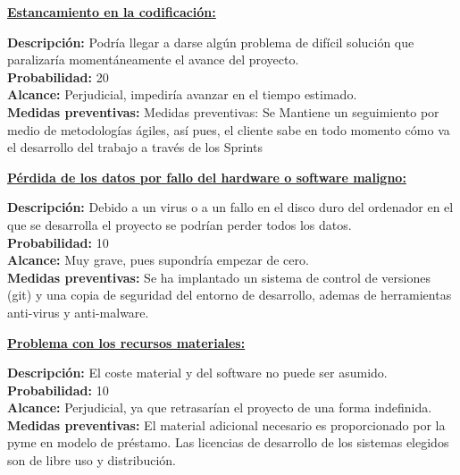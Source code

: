	\begin{shaded}
		\underline{\textbf{Estancamiento en la codificación:}}
		\begin{flushleft}	
			\textbf{Descripción:}  Podría llegar a darse algún problema de difícil solución que paralizaría momentáneamente el avance del proyecto.\\
			\textbf{Probabilidad:} 20\\
			\textbf{Alcance:} Perjudicial, impediría avanzar en el tiempo estimado.\\
			\textbf{Medidas preventivas:} Medidas preventivas: Se Mantiene un seguimiento por medio de metodologías ágiles, así pues, el cliente sabe en todo momento cómo va el desarrollo del trabajo a través de los Sprints  
		\end{flushleft}			
	\end{shaded}
\clearpage	
	\begin{shaded}
		\underline{\textbf{Pérdida de los datos por fallo del hardware o software maligno:}}
		\begin{flushleft}	
			\textbf{Descripción:} Debido a un virus o a un fallo en el disco duro del ordenador en el que se desarrolla el proyecto se podrían perder todos los datos.\\
			\textbf{Probabilidad:} 10\\
			\textbf{Alcance:} Muy grave, pues supondría empezar de cero.\\
			\textbf{Medidas preventivas:} Se ha implantado un sistema de control de versiones (git) y una copia de seguridad del entorno de desarrollo, ademas de herramientas anti-virus y anti-malware. 
		\end{flushleft}			
	\end{shaded}
		
	\begin{shaded}
		\underline{\textbf{Problema con los recursos materiales:}}
		\begin{flushleft}	
			\textbf{Descripción:} El coste material y del software no puede ser asumido.\\
			\textbf{Probabilidad:} 10\\
			\textbf{Alcance:} Perjudicial, ya que retrasarían el proyecto de una forma indefinida.\\
			\textbf{Medidas preventivas:}  El material adicional necesario es proporcionado por la pyme en modelo de préstamo. Las licencias de desarrollo de los sistemas elegidos son de libre uso y distribución.  
		\end{flushleft}			
	\end{shaded}

